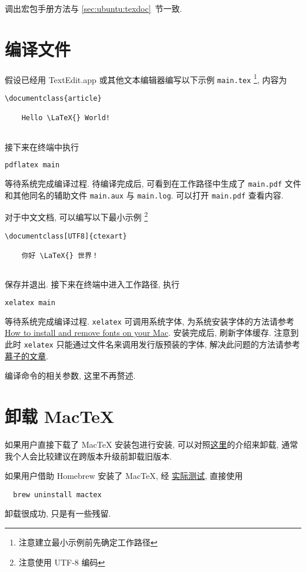 调出宏包手册方法与 \ref{sec:ubuntu:texdoc}~节一致.

\section{编译文件}

假设已经用 TextEdit.app 或其他文本编辑器编写以下示例 \texttt{main.tex}%
\footnote{注意建立最小示例前先确定工作路径},
内容为
\begin{lstlisting}[language = {[LaTeX]TeX}]
  \documentclass{article}
  
    Hello \LaTeX{} World!
  
\end{lstlisting}
接下来在\textsf{终端}中执行
\begin{lstlisting}[language=bash]
  pdflatex main
\end{lstlisting}
等待系统完成编译过程. 
待编译完成后, 可看到在工作路径中生成了 \texttt{main.pdf}
文件和其他同名的辅助文件 \texttt{main.aux} 与 \texttt{main.log}.
可以打开 \texttt{main.pdf} 查看内容.

对于中文文档, 可以编写以下最小示例%
\footnote{注意使用 UTF-8 编码}%
\begin{lstlisting}[language={[LaTeX]TeX}]
  \documentclass[UTF8]{ctexart}
  
    你好 \LaTeX{} 世界！
  
\end{lstlisting}
保存并退出.
接下来在\textsf{终端}中进入工作路径,
执行
\begin{lstlisting}[language=bash]
  xelatex main
\end{lstlisting}
等待系统完成编译过程.
\texttt{xelatex} 可调用系统字体,
为系统安装字体的方法请参考
\href{https://support.apple.com/en-us/HT201749}{How to install and remove fonts on your Mac}.
安装完成后, 刷新字体缓存.
注意到此时 \texttt{xelatex} 只能通过文件名来调用发行版预装的字体,
解决此问题的方法请参考%
\href{https://zhuanlan.zhihu.com/p/59774395}{慕子的文章}.

编译命令的相关参数, 这里不再赘述.

\section{卸载 Mac\TeX}

如果用户直接下载了 Mac\TeX{} 安装包进行安装,
可以对照\href{https://www.tug.org/mactex/uninstalling.html}{这里}的介绍来卸载,
通常我个人会比较建议在跨版本升级前卸载旧版本.

如果用户借助 Homebrew 安装了 Mac\TeX,
经%
\href{https://github.com/OsbertWang/install-latex-guide-zh-cn/pull/39#discussion_r1368152254}{实际测试},
直接使用
\begin{lstlisting}
  brew uninstall mactex
\end{lstlisting}
卸载很成功,
只是有一些残留.

